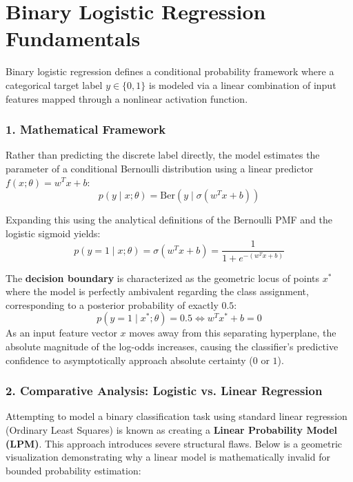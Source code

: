 \documentclass{article}
\begin{document}
\section*{Binary Logistic Regression Fundamentals}

Binary logistic regression defines a conditional probability framework where a categorical target label $y \in \{0,1\}$ is modeled via a linear combination of input features mapped through a nonlinear activation function.

\subsubsection*{1. Mathematical Framework}
Rather than predicting the discrete label directly, the model estimates the parameter of a conditional Bernoulli distribution using a linear predictor $f(x; \theta) = w^T x + b$:
\begin{equation}
    p(y \mid x; \theta) = \text{Ber}\left(y \mid \sigma(w^T x + b)\right)
\end{equation}

\noindent Expanding this using the analytical definitions of the Bernoulli PMF and the logistic sigmoid yields:
\begin{equation}
    p(y = 1 \mid x; \theta) = \sigma(w^T x + b) = \frac{1}{1 + e^{-(w^T x + b)}}
\end{equation}

The \textbf{decision boundary} is characterized as the geometric locus of points $x^*$ where the model is perfectly ambivalent regarding the class assignment, corresponding to a posterior probability of exactly $0.5$:
\begin{equation}
    p(y = 1 \mid x^*; \theta) = 0.5 \iff w^T x^* + b = 0
\end{equation}
As an input feature vector $x$ moves away from this separating hyperplane, the absolute magnitude of the log-odds increases, causing the classifier's predictive confidence to asymptotically approach absolute certainty ($0$ or $1$).

\subsubsection*{2. Comparative Analysis: Logistic vs. Linear Regression}
Attempting to model a binary classification task using standard linear regression (Ordinary Least Squares) is known as creating a \textbf{Linear Probability Model (LPM)}. This approach introduces severe structural flaws. Below is a geometric visualization demonstrating why a linear model is mathematically invalid for bounded probability estimation:
\end{document}
